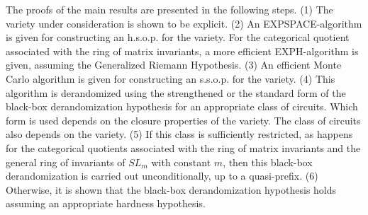 \documentclass[11pt]{article}
\begin{document}
The proofs of the main results are presented  in the following steps. (1) 
The variety under consideration is shown to be explicit. (2) An 
EXPSPACE-algorithm is given   for  constructing an h.s.o.p. for the variety. 
For the  categorical quotient associated with the ring of matrix invariants, 
a more efficient EXPH-algorithm is given, assuming the Generalized Riemann Hypothesis.
(3) An efficient Monte Carlo algorithm is given for constructing an s.s.o.p. 
for the variety. (4) This algorithm is   derandomized using
the strengthened or the standard form of the black-box derandomization hypothesis for
an appropriate class of circuits.  Which form is used depends on the  closure properties
of the variety. The class of circuits also depends on the variety. (5) If this class
is sufficiently restricted, as  happens for  the categorical quotients
associated with the ring of matrix invariants and the general ring of invariants of $SL_m$ with
constant $m$, then this black-box derandomization 
is  carried out unconditionally, up to a quasi-prefix. (6) Otherwise, it is shown that 
the black-box derandomization hypothesis holds assuming an appropriate hardness hypothesis.
\end{document}
